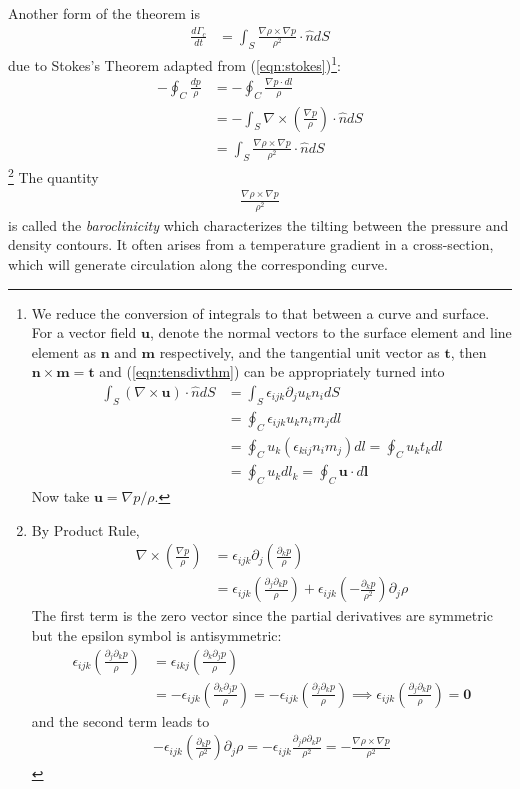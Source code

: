 Another form of the theorem is
\begin{align}
\frac{d\Gamma_c}{dt} &= \int_S \frac{\nabla \rho \times \nabla p}{\rho^2} \cdot \hat{n} dS     
\end{align}
due to Stokes's Theorem adapted from (\ref{eqn:stokes})\footnote{We reduce the conversion of integrals to that between a curve and surface. For a vector field $\textbf{u}$, denote the normal vectors to the surface element and line element as $\textbf{n}$ and $\textbf{m}$ respectively, and the tangential unit vector as $\textbf{t}$, then $\textbf{n} \times \textbf{m} = \textbf{t}$ and (\ref{eqn:tensdivthm}) can be appropriately turned into
\begin{align*}
\int_S (\nabla \times \textbf{u}) \cdot \hat{n} dS &= \int_S \epsilon_{ijk}\partial_j u_k n_i dS \\
&= \oint_C \epsilon_{ijk} u_k n_i m_j dl \\
&= \oint_C u_k (\epsilon_{kij} n_i m_j) dl = \oint_C u_k t_k dl \\
&= \oint_C u_k dl_k = \oint_C \textbf{u} \cdot d\textbf{l}
\end{align*}
Now take $\textbf{u} = \nabla p/\rho$.}:
\begin{align*}
- \oint_C \frac{dp}{\rho} &= - \oint_C \frac{\nabla p \cdot dl}{\rho} \\
&= - \int_S \nabla \times (\frac{\nabla p}{\rho}) \cdot \hat{n} dS \\
&= \int_S  \frac{\nabla \rho \times \nabla p}{\rho^2} \cdot \hat{n} dS     
\end{align*}
\footnote{By Product Rule, \begin{align*}
\nabla \times (\frac{\nabla p}{\rho}) &= \epsilon_{ijk}\partial_j(\frac{\partial_k p}{\rho}) \\
&= \epsilon_{ijk}(\frac{\partial_j\partial_k p}{\rho}) + \epsilon_{ijk}(-\frac{\partial_k p}{\rho^2})\partial_j\rho
\end{align*}
The first term is the zero vector since the partial derivatives are symmetric but the epsilon symbol is antisymmetric:
\vspace{\maxdimen}
\begin{align*}
\epsilon_{ijk}(\frac{\partial_j\partial_k p}{\rho}) &= \epsilon_{ikj}(\frac{\partial_k\partial_j p}{\rho}) \\
&= -\epsilon_{ijk}(\frac{\partial_k\partial_j p}{\rho}) = -\epsilon_{ijk}(\frac{\partial_j\partial_k p}{\rho}) \implies \epsilon_{ijk}(\frac{\partial_j\partial_k p}{\rho}) = \textbf{0}
\end{align*}
and the second term leads to
\begin{align*}
-\epsilon_{ijk}(\frac{\partial_k p}{\rho^2})\partial_j\rho = -\epsilon_{ijk}\frac{\partial_j\rho \partial_k p}{\rho^2} = -\frac{\nabla \rho \times \nabla p}{\rho^2}
\end{align*}}
The quantity 
\begin{align}
\frac{\nabla \rho \times \nabla p}{\rho^2}    
\end{align}
is called the \textit{baroclinicity} which characterizes the tilting between the pressure and density contours. It often arises from a temperature gradient in a cross-section, which will generate circulation along the corresponding curve.

